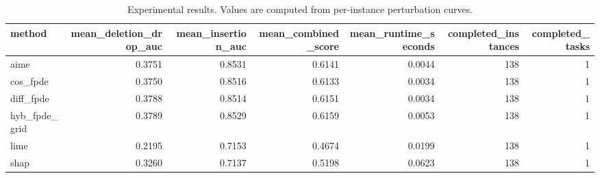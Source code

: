 \begin{table}[t]
\caption{Experimental results. Values are computed from per-instance perturbation curves.}
\label{tab:main_results_computed}
\centering
\begin{tabular}{lrrrrrr}
\toprule
method & mean\_deletion\_drop\_auc & mean\_insertion\_auc & mean\_combined\_score & mean\_runtime\_seconds & completed\_instances & completed\_tasks \\
\midrule
aime & 0.3751 & 0.8531 & 0.6141 & 0.0044 & 138 & 1 \\
cos\_fpde & 0.3750 & 0.8516 & 0.6133 & 0.0034 & 138 & 1 \\
diff\_fpde & 0.3788 & 0.8514 & 0.6151 & 0.0034 & 138 & 1 \\
hyb\_fpde\_grid & 0.3789 & 0.8529 & 0.6159 & 0.0053 & 138 & 1 \\
lime & 0.2195 & 0.7153 & 0.4674 & 0.0199 & 138 & 1 \\
shap & 0.3260 & 0.7137 & 0.5198 & 0.0623 & 138 & 1 \\
\bottomrule
\end{tabular}

\end{table}
